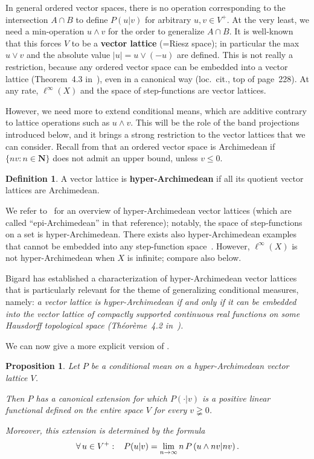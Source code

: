 \documentclass[11pt]{amsart}
\numberwithin{equation}{section}
\newtheorem{prop}[thm]{Proposition}
\theoremstyle{definition}
\newtheorem{defi}[thm]{Definition}
\theoremstyle{definition}
\newcommand*{\NN}{\mathbf{N}}
\begin{document}
\medskip
In general ordered vector spaces, there is no operation corresponding to the intersection $A\cap B$ to define $P(u|v)$ for arbitrary $u,v\in V^+$. At the very least, we need a min-operation $u\wedge v$ for the order to generalize $A\cap B$. It is well-known~\cite[\S1]{Aliprantis-Tourky} that this forces $V$ to be a \textbf{vector lattice} (=Riesz space); in particular the max $u\vee v$ and the absolute value $|u|=u\vee (-u)$ are defined. This is not really a restriction, because any ordered vector space can be embedded into a vector lattice (Theorem~4.3 in~\cite{Luxemburg86}), even in a canonical way (loc.\ cit., top of page~228). At any rate, $\ell^\infty(X)$ and the space of step-functions are vector lattices.

However, we need more to extend conditional means, which are additive contrary to lattice operations such as $u\wedge v$. This will be the role of the band projections introduced below, and it brings a strong restriction to the vector lattices that we can consider. Recall from  that an ordered vector space is Archimedean if $\{n v:n\in \NN\}$ does not admit an upper bound, unless $v\leq 0$.

\begin{defi}
A vector lattice is \textbf{hyper-Archimedean} if all its quotient vector lattices are Archimedean.
\end{defi}

We refer to~\cite{Conrad74} for an overview of hyper-Archimedean vector lattices (which are called ``epi-Archimedean'' in that reference); notably, the space of step-functions on a set is hyper-Archimedean. There exists also hyper-Archimedean examples that cannot be embedded into any step-function space~\cite{Bernau74}. However, $\ell^\infty(X)$ is not hyper-Archimedean when $X$ is infinite; compare also  below.

Bigard has established a characterization of hyper-Archimedean vector lattices that is particularly relevant for the theme of generalizing conditional measures, namely: \itshape a vector lattice is hyper-Archimedean if and only if it can be embedded into the vector lattice of compactly supported continuous real functions on some Hausdorff topological space \upshape (Th{\'e}or{\`e}me~4.2 in~\cite{Bigard}).

\medskip
We can now give a more explicit version of .

\begin{prop}\label{prop:hyper-Arch-explicit}
Let $P$ be a conditional mean on a hyper-Archimedean vector lattice $V$.

Then $P$ has a canonical extension for which $P(\cdot | v)$ is a positive linear functional defined on the entire space $V$ for every $v\gneqq 0$. 

Moreover, this extension is determined by the formula
\begin{equation*}
\forall \, u\in V^+: \kern3mm P(u|v) = \lim_{n\to\infty}  n\, P\left(u \wedge n v |n v\right).
\end{equation*}
\end{prop}
\end{document}
